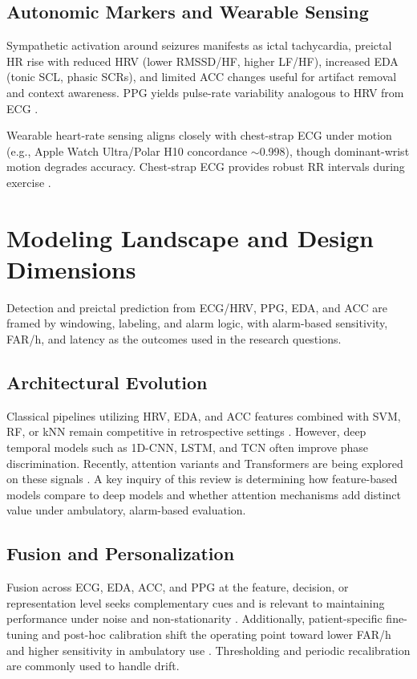 \subsection{Autonomic Markers and Wearable Sensing}
Sympathetic activation around seizures manifests as ictal tachycardia,
preictal HR rise with reduced HRV (lower RMSSD/HF, higher LF/HF),
increased EDA (tonic SCL, phasic SCRs), and limited ACC changes
useful for artifact removal and context awareness. PPG yields
pulse-rate variability analogous to HRV from ECG
\parencite{mironAutonomicBiosignalsSeizure2025,masonHeartRateVariability2024}.

Wearable heart-rate sensing aligns closely with chest-strap ECG under
motion (e.g., Apple Watch Ultra/Polar H10 concordance $\sim$0.998),
though dominant-wrist motion degrades accuracy. Chest-strap ECG
provides robust RR intervals during exercise
\parencite{wolfHearttoWearAssessingAccuracy2024a}.

\section{Modeling Landscape and Design Dimensions}

Detection and preictal prediction from ECG/HRV, PPG, EDA, and ACC are
framed by windowing, labeling, and alarm logic, with alarm-based
sensitivity, FAR/h, and latency as the outcomes used in the research
questions.

\subsection{Architectural Evolution}
Classical pipelines utilizing HRV, EDA, and ACC features combined with
SVM, RF, or kNN remain competitive in retrospective settings
\parencite{sethFeasibilityCardiacbasedSeizure2023,masonHeartRateVariability2024}.
However, deep temporal models such as 1D-CNN, LSTM, and TCN often
improve phase discrimination. Recently, attention variants and
Transformers are being explored on these signals
\parencite{yangMultimodalAISystem2022,pordoyEnhancedNonEEGMultimodal2025,
abtahiIdentificationRelevantECG2025,kalousiosECGbasedEpilepticSeizure2024}.
A key inquiry of this review is determining how feature-based models
compare to deep models and whether attention mechanisms add distinct
value under ambulatory, alarm-based evaluation.

\subsection{Fusion and Personalization}
Fusion across ECG, EDA, ACC, and PPG at the feature, decision, or
representation level seeks complementary cues and is relevant to
maintaining performance under noise and non-stationarity
\parencite{yangMultimodalAISystem2022,pordoyEnhancedNonEEGMultimodal2025}.
Additionally, patient-specific fine-tuning and post-hoc calibration
shift the operating point toward lower FAR/h and higher sensitivity in
ambulatory use \parencite{andradePerformanceSeizurePrediction2024}.
Thresholding and periodic recalibration are commonly used to handle
drift.

